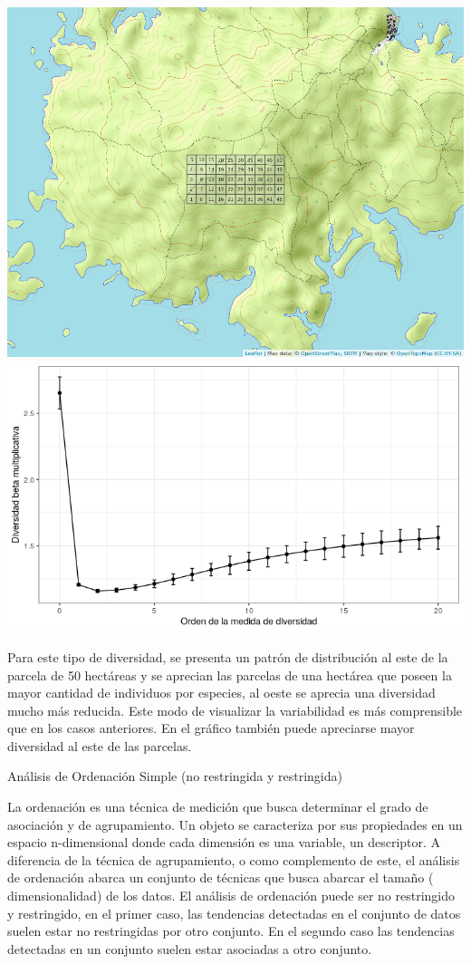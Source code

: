 \documentclass[11pt,]{article}
\begin{document}
\includegraphics[width=1.00000\textwidth]{mapa_cuadros.png}
\includegraphics[width=1.00000\textwidth]{diversidad_beta.png}

Para este tipo de diversidad, se presenta un patrón de distribución al
este de la parcela de 50 hectáreas y se aprecian las parcelas de una
hectárea que poseen la mayor cantidad de individuos por especies, al
oeste se aprecia una diversidad mucho más reducida. Este modo de
visualizar la variabilidad es más comprensible que en los casos
anteriores. En el gráfico también puede apreciarse mayor diversidad al
este de las parcelas.

Análisis de Ordenación Simple (no restringida y restringida)

La ordenación es una técnica de medición que busca determinar el grado
de asociación y de agrupamiento. Un objeto se caracteriza por sus
propiedades en un espacio n-dimensional donde cada dimensión es una
variable, un descriptor. A diferencia de la técnica de agrupamiento, o
como complemento de este, el análisis de ordenación abarca un conjunto
de técnicas que busca abarcar el tamaño ( dimensionalidad) de los datos.
El análisis de ordenación puede ser no restringido y restringido, en el
primer caso, las tendencias detectadas en el conjunto de datos suelen
estar no restringidas por otro conjunto. En el segundo caso las
tendencias detectadas en un conjunto suelen estar asociadas a otro
conjunto.
\end{document}
